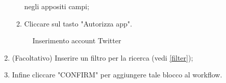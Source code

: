 \begin{enumerate}
\begin{enumerate}
			negli appositi campi;
			\item Cliccare sul tasto "Autorizza app".
		\end{enumerate}
	\begin{figure}[!ht]
		\centering
		\caption{Inserimento account Twitter}
	\end{figure}
	\newpage
	\item (Facoltativo) Inserire un filtro per la ricerca (vedi \ref{filter});
	\item Infine cliccare "CONFIRM" per aggiungere tale blocco al workflow.
	\begin{figure}[!ht]
		\centering

\end{figure}
\end{enumerate}
